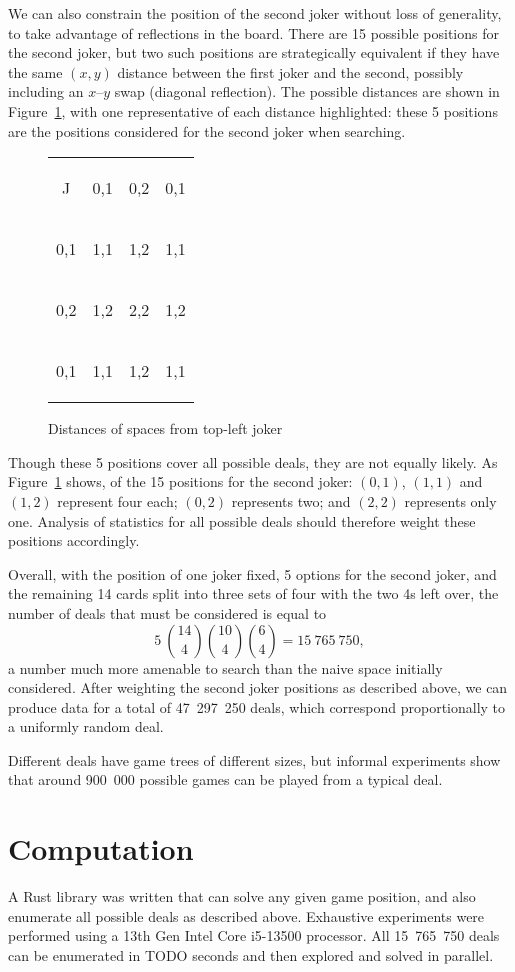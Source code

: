 \documentclass[a4paper, twocolumn]{article}
\newcommand\card[1]{\begin{tcolorbox}#1\end{tcolorbox}}
\newcommand\emphcard[1]{\begin{tcolorbox}[colback=red!30]#1\end{tcolorbox}}
\newcommand\customboard[8]{
  \setlength{\tabcolsep}{0.1cm}
  \begin{tabular}{c c c c}
    #1 & #2 & #3 & #4 \\
    #5 & #6 & #7 & #8 \\
    \customboardmore
}
\newcommand\customboardmore[8]{
    #1 & #2 & #3 & #4 \\
    #5 & #6 & #7 & #8
  \end{tabular}
}
\begin{document}
We can also constrain the position of the second joker without loss of
generality, to take advantage of reflections in the board. There are 15 possible positions for the second joker, but two
such positions are strategically equivalent if they have the same $(x, y)$
distance between the first joker and the second,
possibly including an $x$--$y$ swap (diagonal reflection). The possible distances are shown in
Figure~\ref{fig:joker-distances}, with one representative of each distance
highlighted: these 5 positions are the positions considered for the second joker
when searching.

\begin{figure}[ht]
  \centering
  \customboard
  {\card{J}} {\emphcard{0,1}} {\emphcard{0,2}} {\card{0,1}}
  {\card{0,1}} {\emphcard{1,1}} {\emphcard{1,2}} {\card{1,1}}
  {\card{0,2}} {\card{1,2}} {\emphcard{2,2}} {\card{1,2}}
  {\card{0,1}} {\card{1,1}} {\card{1,2}} {\card{1,1}}
  \caption{Distances of spaces from top-left joker}
  \label{fig:joker-distances}
\end{figure}

Though these 5 positions cover all possible deals, they are not equally
likely. As Figure~\ref{fig:joker-distances} shows, of the 15 positions for the
second joker: $(0,1)$, $(1,1)$ and $(1,2)$ represent four each; $(0,2)$
represents two; and $(2,2)$ represents only one. Analysis of statistics for all
possible deals should therefore weight these positions accordingly.

Overall, with the position of one joker fixed, 5 options for the second joker,
and the remaining 14 cards split into three sets of four with the two 4s left
over, the number of deals that must be considered is equal to
$$5~\binom{14}{4} \binom{10}{4} \binom{6}{4} = 15~765~750,$$
a number much more amenable to search than the naive space initially considered.
After weighting the second joker positions as described above, we can produce
data for a total of 47~297~250 deals, which correspond proportionally to a
uniformly random deal.

Different deals have game trees of different sizes, but informal experiments
show that around 900~000 possible games can be played from a typical deal.


\section{Computation}

A Rust library \cite{github} was written that can solve any given game position,
and also enumerate all possible deals as described above. Exhaustive experiments
were performed using a 13th Gen Intel Core i5-13500 processor. All 15~765~750
deals can be enumerated in TODO seconds and then explored and solved in
parallel.
\end{document}
